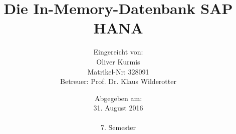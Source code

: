 
\begin{titlepage}
\titlehead{\large FOM Hochschule für Oekonomie \& Management Essen\\ 
Standort München\\
\normalsize Berufsbegleitender Studiengang zum B.Sc.\ Wirtschaftsinformatik}
\subject{\vspace{1cm}Seminararbeit}
\title{Die In-Memory-Datenbank SAP HANA}
\author{
 {\normalsize Eingereicht von:}
   \\Oliver Kurmis\\
  {\normalsize Matrikel-Nr: 328091}\\
  {\normalsize Betreuer: Prof. Dr. Klaus Wilderotter}
}
\date{{\normalsize Abgegeben am:}\\31. August 2016\\\\7. Semester}

\end{titlepage}

\maketitle 

\thispagestyle{empty}

